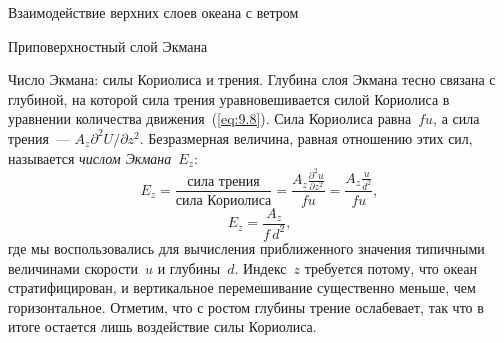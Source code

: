 \begin{chapter}{Взаимодействие верхних слоев океана с ветром}
\begin{section}{Приповерхностный слой Экмана}
\begin{paragraph}{Число Экмана: силы Кориолиса и трения.}
Глубина слоя Экмана тесно связана с глубиной, на которой сила трения 
уравновешивается силой Кориолиса в уравнении количества
движения~(\ref{eq:9.8}). Сила Кориолиса равна~$f u$, а сила 
трения~--- $A_z \partial^2 U/\partial z^2$. Безразмерная величина, равная
отношению этих сил, называется 
\emph{числом Экмана}~$E_z$:
\begin{displaymath}
 E_z= \frac{\text{сила трения}}{\text{сила Кориолиса}} 
    = \frac{A_z\frac{\partial^2u}{\partial{z^2}}}{fu} 
    = \frac{A_z\frac{u}{d^2}}{fu},
\end{displaymath}
\begin{equation}\label{eq:9.17}
 \boxed{E_z = \frac{A_z}{f\,d^2},}
\end{equation}
где мы воспользовались для вычисления приближенного значения типичными
величинами скорости~$u$ и глубины~$d$. Индекс~$z$ требуется потому, что океан
стратифицирован, и вертикальное перемешивание существенно меньше, 
чем горизонтальное. Отметим, что с ростом глубины трение ослабевает, так что
в итоге остается лишь воздействие силы Кориолиса.
%


\end{paragraph}
\end{section}
\end{chapter}
